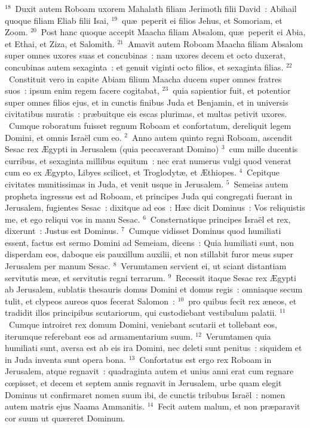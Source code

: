 ${}^{18}$~Duxit autem Roboam uxorem Mahalath filiam Jerimoth filii David~: Abihail quoque filiam Eliab filii Isai,
${}^{19}$~qu\ae\ peperit ei filios Jehus, et Somoriam, et Zoom.
${}^{20}$~Post hanc quoque accepit Maacha filiam Absalom, qu\ae\ peperit ei Abia, et Ethai, et Ziza, et Salomith.
${}^{21}$~Amavit autem Roboam Maacha filiam Absalom super omnes uxores suas et concubinas~: nam uxores decem et octo duxerat, concubinas autem sexaginta~: et genuit viginti octo filios, et sexaginta filias.
${}^{22}$~Constituit vero in capite Abiam filium Maacha ducem super omnes fratres suos~: ipsum enim regem facere cogitabat,
${}^{23}$~quia sapientior fuit, et potentior super omnes filios ejus, et in cunctis finibus Juda et Benjamin, et in universis civitatibus muratis~: pr\ae buitque eis escas plurimas, et multas petivit uxores.
~\lettrine[lines=10,image=true,loversize=0.05,lraise=-0.03]{C}{}umque roboratum fuisset regnum Roboam et confortatum, dereliquit legem Domini, et omnis Isra\"el cum eo.
${}^{2}$~Anno autem quinto regni Roboam, ascendit Sesac rex \AE gypti in Jerusalem (quia peccaverant Domino)
${}^{3}$~cum mille ducentis curribus, et sexaginta millibus equitum~: nec erat numerus vulgi quod venerat cum eo ex \AE gypto, Libyes scilicet, et Troglodyt\ae , et \AE thiopes.
${}^{4}$~Cepitque civitates munitissimas in Juda, et venit usque in Jerusalem.
${}^{5}$~Semeias autem propheta ingressus est ad Roboam, et principes Juda qui congregati fuerant in Jerusalem, fugientes Sesac~: dixitque ad eos~: H\ae c dicit Dominus~: Vos reliquistis me, et ego reliqui vos in manu Sesac.
${}^{6}$~Consternatique principes Isra\"el et rex, dixerunt~: Justus est Dominus.
${}^{7}$~Cumque vidisset Dominus quod humiliati essent, factus est sermo Domini ad Semeiam, dicens~: Quia humiliati sunt, non disperdam eos, daboque eis pauxillum auxilii, et non stillabit furor meus super Jerusalem per manum Sesac.
${}^{8}$~Verumtamen servient ei, ut sciant distantiam servitutis me\ae , et servitutis regni terrarum.
${}^{9}$~Recessit itaque Sesac rex \AE gypti ab Jerusalem, sublatis thesauris domus Domini et domus regis~: omniaque secum tulit, et clypeos aureos quos fecerat Salomon~:
${}^{10}$~pro quibus fecit rex \ae neos, et tradidit illos principibus scutariorum, qui custodiebant vestibulum palatii.
${}^{11}$~Cumque introiret rex domum Domini, veniebant scutarii et tollebant eos, iterumque referebant eos ad armamentarium suum.
${}^{12}$~Verumtamen quia humiliati sunt, aversa est ab eis ira Domini, nec deleti sunt penitus~: siquidem et in Juda inventa sunt opera bona.
${}^{13}$~Confortatus est ergo rex Roboam in Jerusalem, atque regnavit~: quadraginta autem et unius anni erat cum regnare cœpisset, et decem et septem annis regnavit in Jerusalem, urbe quam elegit Dominus ut confirmaret nomen suum ibi, de cunctis tribubus Isra\"el~: nomen autem matris ejus Naama Ammanitis.
${}^{14}$~Fecit autem malum, et non pr\ae paravit cor suum ut qu\ae reret Dominum.


